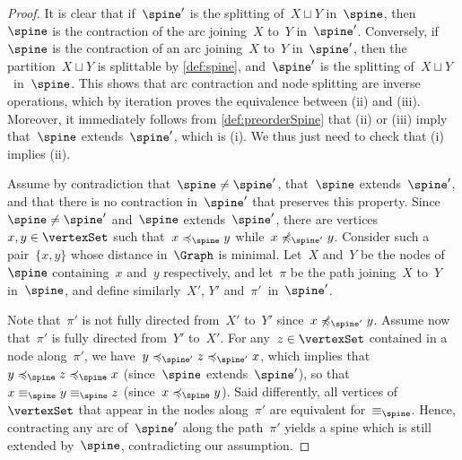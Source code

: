 \documentclass{amsart}
\theoremstyle{definition}
\begin{document}
\begin{proof}
  It is clear that if~$\spine'$ is the splitting of~$X \sqcup Y$ in~$\spine$, then~$\spine$ is the contraction of the arc joining~$X$ to~$Y$ in~$\spine'$.
  Conversely, if~$\spine$ is the contraction of an arc joining~$X$ to~$Y$ in~$\spine'$, then the partition~$X \sqcup Y$ is splittable by \cref{def:spine}, and~$\spine'$ is the splitting of~$X \sqcup Y$~in~$\spine$.
  This shows that arc contraction and node splitting are inverse operations, which by iteration proves the equivalence between (ii) and (iii).
  Moreover, it immediately follows from \cref{def:preorderSpine} that (ii) or (iii) imply that~$\spine$ extends~$\spine'$, which is (i).
  We thus just need to check that (i) implies (ii).

  Assume by contradiction that~$\spine \ne \spine'$, that~$\spine$ extends~$\spine'$, and that there is no contraction in~$\spine'$ that preserves this property.
  Since~$\spine \ne \spine'$ and~$\spine$ extends~$\spine'$, there are vertices~$x, y \in \vertexSet$ such that~$x \preccurlyeq_{\spine} y$ while~$x \not\preccurlyeq_{\spine'} y$.
  Consider such a pair~$\{x,y\}$ whose distance in~$\Graph$ is minimal.
  Let~$X$ and~$Y$ be the nodes of~$\spine$ containing~$x$ and~$y$ respectively, and let~$\pi$ be the path joining~$X$ to~$Y$ in~$\spine$, and define similarly~$X'$, $Y'$ and~$\pi'$~in~$\spine'$.

  Note that~$\pi'$ is not fully directed from~$X'$ to~$Y'$ since~$x \not\preccurlyeq_{\spine'} y$.
  Assume now that~$\pi'$ is fully directed from~$Y'$ to~$X'$.
  For any~$z \in \vertexSet$ contained in a node along~$\pi'$, we have~$y \preccurlyeq_{\spine'} z \preccurlyeq_{\spine'} x$, which implies that~$y \preccurlyeq_{\spine} z \preccurlyeq_{\spine} x$ (since~$\spine$ extends~$\spine'$), so that~$x \equiv_{\spine} y \equiv_{\spine} z$ (since~$x \preccurlyeq_{\spine} y$).
  Said differently, all vertices of~$\vertexSet$ that appear in the nodes along~$\pi'$ are equivalent for~$\equiv_{\spine}$.
  Hence, contracting any arc of~$\spine'$ along the path~$\pi'$ yields a spine which is still extended by~$\spine$, contradicting our assumption.
  

\end{proof}
\end{document}
